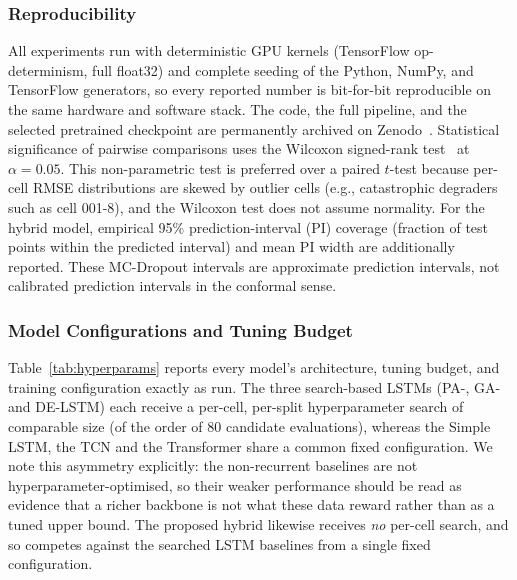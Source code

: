 \subsubsection{Reproducibility}
All experiments run with deterministic GPU kernels
(TensorFlow op-determinism, full float32) and complete seeding of the Python,
NumPy, and TensorFlow generators, so every reported number is bit-for-bit
reproducible on the same hardware and software stack.
The code, the full pipeline, and the selected pretrained checkpoint are
permanently archived on Zenodo~\cite{ponnambalam2026code}.
Statistical significance of pairwise comparisons uses the Wilcoxon
signed-rank test~\cite{wilcoxon1945individual} at $\alpha = 0.05$.
This non-parametric test is preferred over a paired $t$-test because
per-cell RMSE distributions are skewed by outlier cells (e.g., catastrophic
degraders such as cell 001-8), and the Wilcoxon test does not assume normality.
For the hybrid model, empirical 95\% prediction-interval (PI) coverage (fraction
of test points within the predicted interval) and mean PI width are additionally
reported. These MC-Dropout intervals are approximate prediction intervals, not
calibrated prediction intervals in the conformal sense.

\subsubsection{Model Configurations and Tuning Budget}
Table~\ref{tab:hyperparams} reports every model's architecture, tuning budget, and
training configuration exactly as run. The three search-based LSTMs (PA-, GA- and
DE-LSTM) each receive a per-cell, per-split hyperparameter search of comparable
size (of the order of 80 candidate evaluations), whereas the Simple LSTM, the TCN
and the Transformer share a common fixed configuration. We note this asymmetry
explicitly: the non-recurrent baselines are not hyperparameter-optimised, so their
weaker performance should be read as evidence that a richer backbone is not what
these data reward rather than as a tuned upper bound. The proposed hybrid likewise
receives \emph{no} per-cell search, and so competes against the searched LSTM
baselines from a single fixed configuration.

